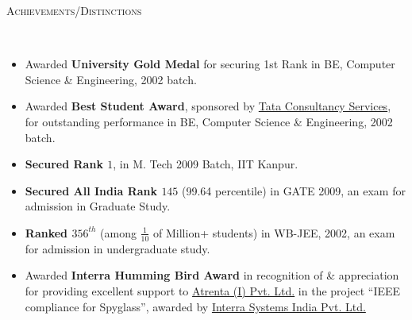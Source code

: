 \documentclass[9pt]{article}
\newenvironment{changemargin}[2]{%
  \begin{list}{}{%
    \setlength{\topsep}{0pt}%
    \setlength{\leftmargin}{#1}%
    \setlength{\rightmargin}{#2}%
    \setlength{\listparindent}{\parindent}%
    \setlength{\itemindent}{\parindent}%
    \setlength{\parsep}{\parskip}%
  }%
  \item[]}{\end{list}
}
\newcommand{\lineover}{
	\begin{changemargin}{-0.05in}{-0.05in}
		\vspace*{-8pt}
		\hrulefill \\
		\vspace*{-2pt}
	\end{changemargin}
}
\newcommand{\header}[1]{
	\begin{changemargin}{-0.5in}{-0.5in}
		\scshape{#1}\\
  	\lineover
	\end{changemargin}
}
\newenvironment{body} {
	\vspace*{-16pt}
	\begin{changemargin}{-0.25in}{-0.5in}
  }	
	{\end{changemargin}
}
\begin{document}
\smallskip

\header{Achievements/Distinctions}

\begin{body}
	\vspace{14pt}
	\begin{itemize} \itemsep -0pt  %
		\item Awarded \textbf{University Gold Medal} for securing 1st Rank in BE, Computer Science \& Engineering, 2002 batch.\\
		\item Awarded \textbf{Best Student Award}, sponsored by \href{http://www.tcs.com}{Tata Consultancy Services}, for outstanding performance in BE, Computer Science \& Engineering, 2002 batch. \\
		\item \textbf{Secured Rank $1$}, in M. Tech 2009 Batch, IIT Kanpur.
		\item \textbf{Secured All India Rank $145$} (99.64 percentile) in GATE 2009, an exam for admission in Graduate Study.
		\item \textbf{Ranked $356^{th}$} (among $\frac{1}{10}$ of Million+ students) in WB-JEE, 2002, an exam for admission in undergraduate study.
		\item Awarded \textbf{Interra Humming Bird Award} in recognition of \& appreciation for providing excellent support to \href{}{Atrenta (I) Pvt. Ltd.} in the project ``IEEE compliance for Spyglass'', awarded by \href{http://www.interrasystems.com/}{Interra Systems India Pvt. Ltd.} 
	\end{itemize} 
\end{body}

\smallskip
\end{document}
